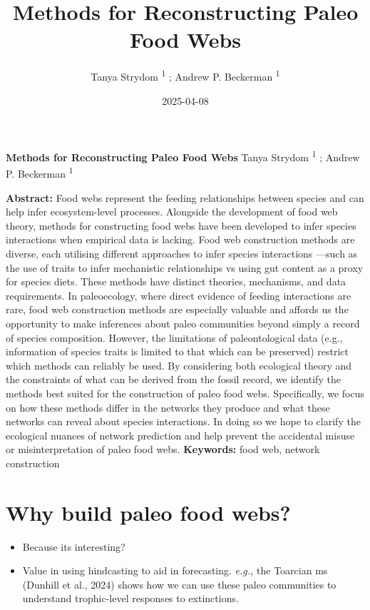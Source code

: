 \documentclass[
]{article}
\title{Methods for Reconstructing Paleo Food Webs}
\author{Tanya Strydom %
%
\textsuperscript{%
%
1%
}%
; Andrew P. Beckerman %
%
\textsuperscript{%
%
1%
}%
}
\date{2025-04-08}
\begin{document}
\thispagestyle{empty}
{\bfseries\sffamily\Large Methods for Reconstructing Paleo Food Webs}
\vfil
Tanya Strydom %
%
\textsuperscript{%
%
1%
}%
; Andrew P. Beckerman %
%
\textsuperscript{%
%
1%
}%

\vfil
{\small
\textbf{Abstract:} Food webs represent the feeding relationships between
species and can help infer ecosystem-level processes. Alongside the
development of food web theory, methods for constructing food webs have
been developed to infer species interactions when empirical data is
lacking. Food web construction methods are diverse, each utilising
different approaches to infer species interactions ---such as the use of
traits to infer mechanistic relationships vs using gut content as a
proxy for species diets. These methods have distinct theories,
mechanisms, and data requirements. In paleoecology, where direct
evidence of feeding interactions are rare, food web construction methods
are especially valuable and affords us the opportunity to make
inferences about paleo communities beyond simply a record of species
composition. However, the limitations of paleontological data (e.g.,
information of species traits is limited to that which can be preserved)
restrict which methods can reliably be used. By considering both
ecological theory and the constraints of what can be derived from the
fossil record, we identify the methods best suited for the construction
of paleo food webs. Specifically, we focus on how these methods differ
in the networks they produce and what these networks can reveal about
species interactions. In doing so we hope to clarify the ecological
nuances of network prediction and help prevent the accidental misuse or
misinterpretation of paleo food webs.
\vfil
\textbf{Keywords:} %
food web, %
network construction%
}
\clearpage
\setcounter{page}{1}
\doublespacing
\linenumbers


\section{Why build paleo food webs?}\label{why-build-paleo-food-webs}

\begin{itemize}
\item
  Because its interesting?
\item
  Value in using hindcasting to aid in forecasting. \emph{e.g.,} the
  Toarcian ms (Dunhill et al., 2024) shows how we can use these paleo
  communities to understand trophic-level responses to extinctions.
\end{itemize}
\end{document}
